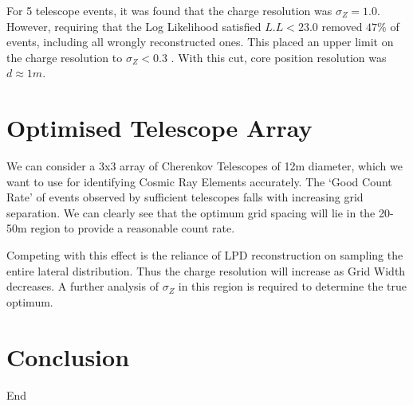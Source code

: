 \documentclass{article}
\begin{document}
For 5 telescope events, it was found that the charge resolution was $\sigma_{Z} = 1.0$. However, requiring that the Log Likelihood satisfied $L.L < 23.0$ removed $47 \%$ of events, including all wrongly reconstructed ones. This placed an upper limit on the charge resolution to $\sigma_{Z} < 0.3$ . With this cut, core position resolution was $d \approx 1 m $.

\section{Optimised Telescope Array}

We can consider a 3x3 array of Cherenkov Telescopes of 12m diameter, which we want to use for identifying Cosmic Ray Elements accurately. The \textquoteleft Good Count Rate' of events observed by sufficient telescopes falls with increasing grid separation. We can clearly see that the optimum grid spacing will lie in the 20-50m region to provide a reasonable count rate.

Competing with this effect is the reliance of LPD reconstruction on sampling the entire lateral distribution. Thus the charge resolution will increase as Grid Width decreases. A further analysis of $\sigma_{Z}$ in this region is required to determine the true optimum.

\section{Conclusion}
End


\end{document}
